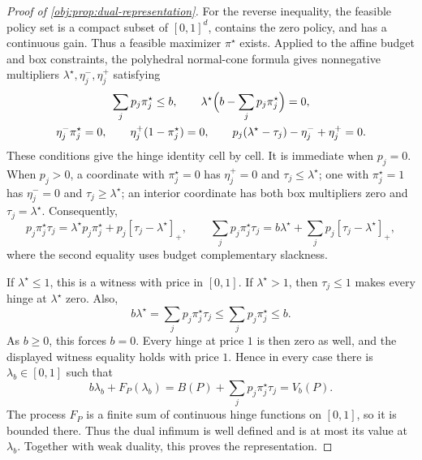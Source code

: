 \begin{proof}[Proof of \cref{obj:prop:dual-representation}]
For the reverse inequality, the feasible policy set is a compact subset of \([0,1]^d\), contains the zero policy, and has a continuous gain. Thus a feasible maximizer \(\pi^\star\) exists. Applied to the affine budget and box constraints, the polyhedral normal-cone formula gives nonnegative multipliers \(\lambda^\star,\eta_j^-,\eta_j^+\) satisfying
\[
\begin{gathered}
\sum_jp_j\pi^\star_j\leq b,\qquad
\lambda^\star\Bigl(b-\sum_jp_j\pi^\star_j\Bigr)=0,\\
\eta_j^-\pi^\star_j=0,\qquad
\eta_j^+(1-\pi^\star_j)=0,\qquad
p_j(\lambda^\star-\tau_j)-\eta_j^-+\eta_j^+=0.
\end{gathered}
\] %
These conditions give the hinge identity cell by cell. It is immediate when \(p_j=0\). When \(p_j>0\), a coordinate with \(\pi^\star_j=0\) has \(\eta_j^+=0\) and \(\tau_j\leq\lambda^\star\); one with \(\pi^\star_j=1\) has \(\eta_j^-=0\) and \(\tau_j\geq\lambda^\star\); an interior coordinate has both box multipliers zero and \(\tau_j=\lambda^\star\). Consequently,
\[
p_j\pi^\star_j\tau_j
=\lambda^\star p_j\pi^\star_j
 +p_j[\tau_j-\lambda^\star]_+,
\qquad
\sum_jp_j\pi^\star_j\tau_j
=b\lambda^\star+\sum_jp_j[\tau_j-\lambda^\star]_+,
\]
where the second equality uses budget complementary slackness. %

If \(\lambda^\star\leq1\), this is a witness with price in \([0,1]\). If \(\lambda^\star>1\), then \(\tau_j\leq1\) makes every hinge at \(\lambda^\star\) zero. Also,
\[
b\lambda^\star
=\sum_jp_j\pi^\star_j\tau_j
\leq\sum_jp_j\pi^\star_j
\leq b.
\]
As \(b\geq0\), this forces \(b=0\). Every hinge at price \(1\) is then zero as well, and the displayed witness equality holds with price \(1\). Hence in every case there is \(\lambda_b\in[0,1]\) such that
\[
b\lambda_b+F_P(\lambda_b)
=B(P)+\sum_jp_j\pi^\star_j\tau_j
=V_b(P).
\] %
The process \(F_P\) is a finite sum of continuous hinge functions on \([0,1]\), so it is bounded there. Thus the dual infimum is well defined and is at most its value at \(\lambda_b\). Together with weak duality, this proves the representation. %


\end{proof}
